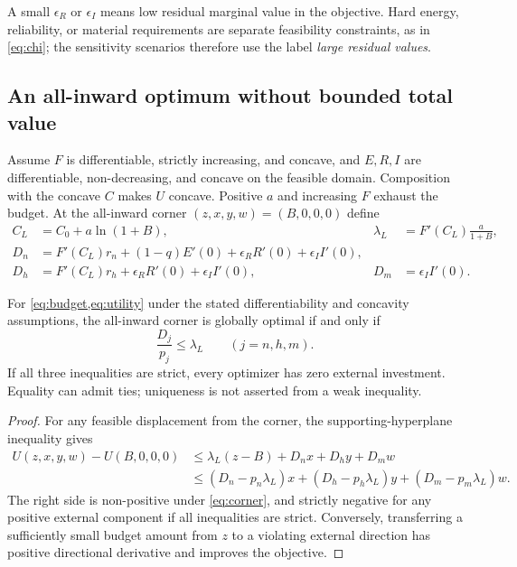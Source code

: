 A small $\epsilon_R$ or $\epsilon_I$ means low residual marginal value in the objective. Hard energy, reliability, or material requirements are separate feasibility constraints, as in \cref{eq:chi}; the sensitivity scenarios therefore use the label \emph{large residual values}.

\subsection{An all-inward optimum without bounded total value}

Assume $F$ is differentiable, strictly increasing, and concave, and $E,R,I$ are differentiable, non-decreasing, and concave on the feasible domain. Composition with the concave $C$ makes $U$ concave. Positive $a$ and increasing $F$ exhaust the budget. At the all-inward corner $(z,x,y,w)=(B,0,0,0)$ define
\begin{align}
 C_L&=C_0+a\ln(1+B),&
 \lambda_L&=F'(C_L)\frac{a}{1+B},\label{eq:local-return}\\
 D_n&=F'(C_L)r_n+(1-q)E'(0)+\epsilon_RR'(0)+\epsilon_II'(0),\nonumber\\
 D_h&=F'(C_L)r_h+\epsilon_RR'(0)+\epsilon_II'(0),&
 D_m&=\epsilon_II'(0).\label{eq:external-return}
\end{align}

\begin{proposition}
\label{prop:corner}
For \cref{eq:budget,eq:utility} under the stated differentiability and concavity assumptions, the all-inward corner is globally optimal if and only if
\begin{equation}
 \frac{D_j}{p_j}\leq\lambda_L\qquad(j=n,h,m).
 \label{eq:corner}
\end{equation}
If all three inequalities are strict, every optimizer has zero external investment. Equality can admit ties; uniqueness is not asserted from a weak inequality.
\end{proposition}
\begin{proof}
For any feasible displacement from the corner, the supporting-hyperplane inequality gives
\begin{align}
 U(z,x,y,w)-U(B,0,0,0)
 &\leq\lambda_L(z-B)+D_nx+D_hy+D_mw\nonumber\\
 &\leq(D_n-p_n\lambda_L)x+(D_h-p_h\lambda_L)y
 +(D_m-p_m\lambda_L)w.
 \label{eq:cornerproof}
\end{align}
The right side is non-positive under \cref{eq:corner}, and strictly negative for any positive external component if all inequalities are strict. Conversely, transferring a sufficiently small budget amount from $z$ to a violating external direction has positive directional derivative and improves the objective.
\end{proof}

